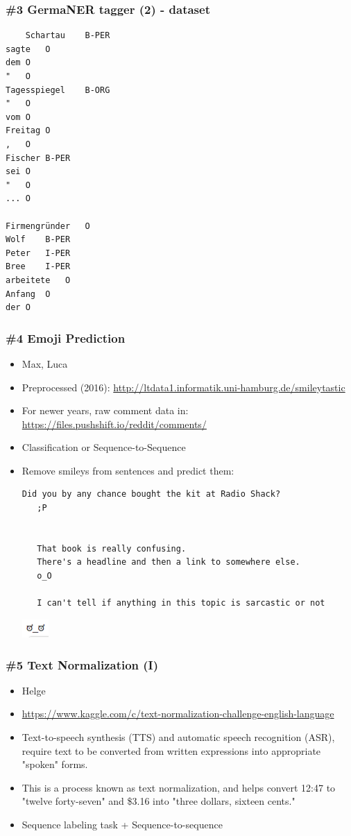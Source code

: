 \documentclass{beamer}
\begin{document}
\begin{frame}[fragile]
\frametitle{\#3 GermaNER tagger (2) - dataset}
\begin{tiny}
  \begin{verbatim}
	Schartau	B-PER
sagte	O
dem	O
"	O
Tagesspiegel	B-ORG
"	O
vom	O
Freitag	O
,	O
Fischer	B-PER
sei	O
"	O
... O

Firmengründer	O
Wolf	B-PER
Peter	I-PER
Bree	I-PER
arbeitete	O
Anfang	O
der	O
  \end{verbatim}
  \end{tiny}
\end{frame}

\begin{frame}[fragile]
\frametitle{\#4 Emoji Prediction}
  \begin{itemize}
  \item Max, Luca
  \item Preprocessed (2016): \url{http://ltdata1.informatik.uni-hamburg.de/smileytastic}
  \item For newer years, raw comment data in: \url{https://files.pushshift.io/reddit/comments/}
  \item Classification or Sequence-to-Sequence
  \item Remove smileys from sentences and predict them:
     \begin{Verbatim}[fontsize=\footnotesize]
   Did you by any chance bought the kit at Radio Shack? 
   ;P
    
    
   That book is really confusing. 
   There's a headline and then a link to somewhere else.  
   o_O
   
   I can't tell if anything in this topic is sarcastic or not
      \end{Verbatim}
      \begin{center}
  		\includegraphics[width=0.08\textwidth]{lod}
  	\end{center}
  \end{itemize}
\end{frame}

\begin{frame}[fragile]
\frametitle{\#5 Text Normalization (I)}
  \begin{itemize}
    \item Helge
    \item \url{https://www.kaggle.com/c/text-normalization-challenge-english-language}
    \item Text-to-speech synthesis (TTS) and automatic speech recognition (ASR), require text to be converted from written expressions into appropriate "spoken" forms. 
    \item This is a process known as text normalization, and helps convert 12:47 to "twelve forty-seven" and \$3.16 into "three dollars, sixteen cents." 
    \item Sequence labeling task + Sequence-to-sequence
  \end{itemize}
\end{frame}
\end{document}
